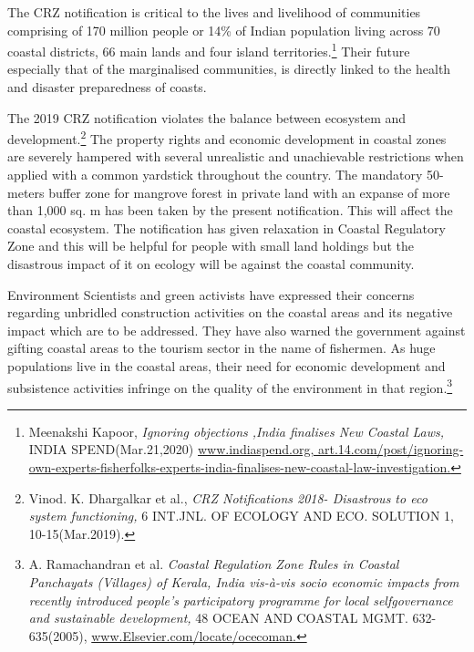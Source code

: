 \begin{multicols}{2}
\vspace{-.1cm}

\noi
The CRZ notification is critical to the lives and livelihood of communities comprising of
170 million people or 14\% of Indian population living across 70 coastal districts, 66 main 
lands and four island territories.\footnote{Meenakshi Kapoor, \textit{Ignoring objections ,India finalises New Coastal Laws,} INDIA SPEND(Mar.21,2020)
\url{www.indiaspend.org, art.14.com/post/ignoring-own-experts-fisherfolks-experts-india-finalises-new-coastal-law-investigation.}} Their future especially that of the marginalised
communities, is directly linked to the health and disaster preparedness of coasts.

\vspace{-.1cm}

\noi
The 2019 CRZ notification violates the balance between ecosystem and development.\footnote{Vinod. K. Dhargalkar et al., \textit{CRZ Notifications 2018- Disastrous to eco system functioning,} 6 INT.JNL. OF
ECOLOGY AND ECO. SOLUTION 1, 10-15(Mar.2019).}
The property rights and economic development in coastal zones are severely hampered
with several unrealistic and unachievable restrictions when applied with a common
yardstick throughout the country. The mandatory 50-meters buffer zone for mangrove
forest in private land with an expanse of more than 1,000 sq. m has been taken by the
present notification. This will affect the coastal ecosystem. The notification has given
relaxation in Coastal Regulatory Zone and this will be helpful for people with small land
holdings but the disastrous impact of it on ecology will be against the coastal community.

\vspace{-.1cm}

\noi
Environment Scientists and green activists have expressed their concerns regarding
unbridled construction activities on the coastal areas and its negative impact which are to
be addressed. They have also warned the government against gifting coastal areas to the
tourism sector in the name of fishermen. As huge populations live in the coastal areas, their
need for economic development and subsistence activities infringe on the quality of the
environment in that region.\footnote{A. Ramachandran et al. \textit{Coastal Regulation Zone Rules in Coastal Panchayats (Villages) of Kerala, India vis-à-vis socio economic impacts from recently introduced people’s participatory programme for local selfgovernance and sustainable development,} 48 OCEAN AND COASTAL MGMT. 632- 635(2005), \url{www.Elsevier.com/locate/ocecoman.}}


\end{multicols}
